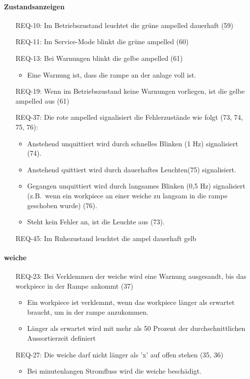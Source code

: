 \paragraph{Zustandsanzeigen}
\begin{itemize}
    \item[REQ-10:] Im Betriebszustand leuchtet die grüne \gls{ampelled} dauerhaft (59)
    \item[REQ-11:] Im Service-Mode blinkt die grüne \gls{ampelled}  (60)
    \item[REQ-13:] Bei Warnungen blinkt die gelbe \gls{ampelled} (61)
    \begin{itemize}
        \item Eine Warnung ist, dass die \gls{rampe} an der \gls{anlage} voll ist.
    \end{itemize}
    \item[REQ-19:] Wenn im Betriebszustand keine Warnungen vorliegen, ist die gelbe \gls{ampelled} aus (61)
    \item[REQ-37:] Die rote \gls{ampelled} signalisiert die Fehlerzustände wie folgt (73, 74, 75, 76):
    \begin{itemize}
        \item Anstehend unquittiert wird durch schnelles Blinken (1 Hz) signalisiert (74).
        \item Anstehend quittiert wird durch dauerhaftes Leuchten(75) signalisiert.
        \item Gegangen unquittiert wird durch langsames Blinken (0,5 Hz) signalisiert (z.B.\ wenn ein
        \gls{workpiece} an einer \gls{weiche} zu langsam in die \gls{rampe} geschoben wurde) (76).
        \item Steht kein Fehler an, ist die Leuchte aus (73).
    \end{itemize}
    \item[REQ-45:] Im Ruhezustand leuchtet die \gls{ampel} dauerhaft gelb
\end{itemize}

\paragraph{\gls{weiche}}
\begin{itemize}
    \item[REQ-23:] Bei Verklemmen der \gls{weiche} wird eine Warnung ausgesandt, bis das \gls{workpiece} in der Rampe ankommt (37)
    \begin{itemize}
        \item Ein \gls{workpiece} ist verklemmt, wenn das \gls{workpiece} länger als erwartet braucht, um in der \gls{rampe} anzukommen.
        \item Länger als erwartet wird mit mehr als 50 Prozent der durchschnittlichen Aussortierzeit definiert
    \end{itemize}
    \item[REQ-27:] Die \gls{weiche} darf nicht länger als 'x' auf offen stehen (35, 36) %
    \begin{itemize}
        \item Bei minutenlangen Stromfluss wird die \gls{weiche} beschädigt.
    \end{itemize}
\end{itemize}

